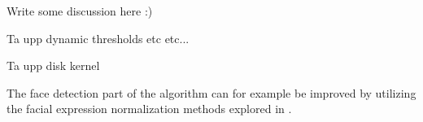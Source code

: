 Write some discussion here :)

Ta upp dynamic thresholds etc etc...

Ta upp disk kernel

The face detection part of the algorithm can for example be improved by utilizing the facial expression normalization methods explored in  \cite{facialExpressions}.




